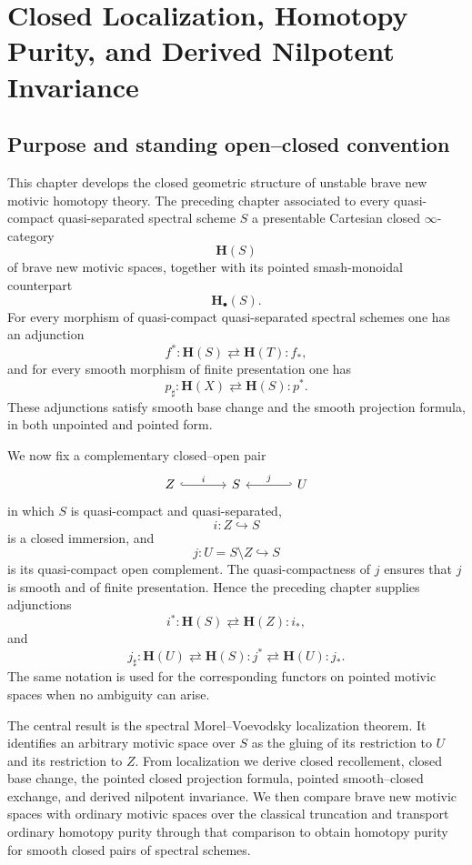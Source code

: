 \chapter{Closed Localization, Homotopy Purity, and Derived Nilpotent Invariance}
\label{chap:closed-localization-purity-nil-invariance}

\section{Purpose and standing open--closed convention}
\label{sec:closed-localization-purpose}

This chapter develops the closed geometric structure of unstable brave
new motivic homotopy theory.  The preceding chapter associated to every
quasi-compact quasi-separated spectral scheme \(S\) a presentable
Cartesian closed \(\infty\)-category
\[
    \mathbf H(S)
\]
of brave new motivic spaces, together with its pointed smash-monoidal
counterpart
\[
    \mathbf H_\bullet(S).
\]
For every morphism of quasi-compact quasi-separated spectral schemes one
has an adjunction
\[
    f^*
    \colon
    \mathbf H(S)
    \rightleftarrows
    \mathbf H(T)
    :
    f_*,
\]
and for every smooth morphism of finite presentation one has
\[
    p_\sharp
    \colon
    \mathbf H(X)
    \rightleftarrows
    \mathbf H(S)
    :
    p^*.
\]
These adjunctions satisfy smooth base change and the smooth projection
formula, in both unpointed and pointed form.

We now fix a complementary closed--open pair
\[
\begin{tikzcd}[column sep=large]
    Z
        \arrow[r, hook, "i"]
    &
    S
    &
    U
        \arrow[l, hook', "j"']
\end{tikzcd}
\]
in which \(S\) is quasi-compact and quasi-separated,
\[
    i
    \colon
    Z
    \hookrightarrow
    S
\]
is a closed immersion, and
\[
    j
    \colon
    U
    =
    S\setminus Z
    \hookrightarrow
    S
\]
is its quasi-compact open complement.  The quasi-compactness of \(j\)
ensures that \(j\) is smooth and of finite presentation.  Hence the
preceding chapter supplies adjunctions
\[
    i^*
    \colon
    \mathbf H(S)
    \rightleftarrows
    \mathbf H(Z)
    :
    i_*,
\]
and
\[
    j_\sharp
    \colon
    \mathbf H(U)
    \rightleftarrows
    \mathbf H(S)
    :
    j^*
    \rightleftarrows
    \mathbf H(U)
    :
    j_*.
\]
The same notation is used for the corresponding functors on pointed
motivic spaces when no ambiguity can arise.

The central result is the spectral Morel--Voevodsky localization
theorem.  It identifies an arbitrary motivic space over \(S\) as the
gluing of its restriction to \(U\) and its restriction to \(Z\).  From
localization we derive closed recollement, closed base change, the
pointed closed projection formula, pointed smooth--closed exchange, and
derived nilpotent invariance.  We then compare brave new motivic spaces
with ordinary motivic spaces over the classical truncation and transport
ordinary homotopy purity through that comparison to obtain homotopy
purity for smooth closed pairs of spectral schemes.

